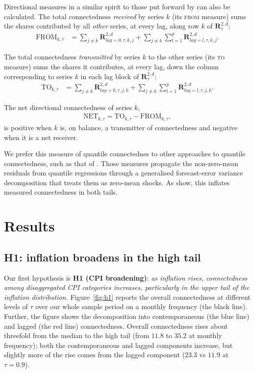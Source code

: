 \documentclass{article}
\begin{document}
Directional measures in a similar spirit to those put forward by \textcite{dieboldyilmaz2012}
can also be calculated. The
total connectedness \emph{received} by series $k$ (its \textsc{from} measure) sums the shares
contributed by all \emph{other} series, at every lag, along row $k$ of $\bm{R}_{\tau}^{2,d}$:
\begin{align}
\mathrm{FROM}_{k,\tau}
  &= \sum_{j\neq k}\bm{R}_{lag=0,\tau,k,j}^{2,d}
   + \sum_{j\neq k}\sum_{l=1}^{p}\bm{R}_{lag=l,\tau,k,j}^{2,d}.
\end{align}

The total connectedness \emph{transmitted} by series $k$ to the other series (its \textsc{to}
measure) sums the shares it contributes, at every lag, down the column corresponding to series $k$ in each lag block of $\bm{R}_{\tau}^{2,d}$:
\begin{align}
\mathrm{TO}_{k,\tau}
  &= \sum_{j\neq k}\bm{R}_{lag=0,\tau,j,k}^{2,d}
   + \sum_{j\neq k}\sum_{l=1}^{p}\bm{R}_{lag=l,\tau,j,k}^{2,d}.
\end{align}

The net directional connectedness of series $k$,
\begin{align}
\mathrm{NET}_{k,\tau} = \mathrm{TO}_{k,\tau} - \mathrm{FROM}_{k,\tau},
\end{align}
is positive when $k$ is, on balance, a transmitter of connectedness and
negative when it is a net receiver.  

We prefer this measure of  quantile connectednes to other approaches to quantile connectedness, such as that of \textcite{ando2022}. Those measures propagate the non-zero-mean residuals from quantile regressions through a generalised forecast-error variance decomposition that treats them as zero-mean shocks. As \textcite{shahzadetal} show, this inflates measured connectedness in both tails.


\section{Results}\label{sec:results}


\subsection{H1: inflation broadens in the high tail}
Our first hypothesis is \textbf{H1 (CPI broadening)}: \textit{as inflation rises,
connectedness among disaggregated CPI categories increases, particularly in the
upper tail of the inflation distribution.}  Figure~\ref{fig:h1} reports the overall
connectedness at different levels of $\tau$ over our whole sample period on a monthly frequency (the black line). Further, the  figure shows the decomposition into contemporaneous (the blue line) and lagged (the red line)
connectedness. Overall connectedness rises about threefold from the
median to the high tail (from $11.8$ to $35.2$ at monthly frequency); both the
contemporaneous and lagged components increase, but slightly more of the rise
comes from the lagged component ($23.3$ vs $11.9$ at $\tau=0.9$).  
\end{document}
